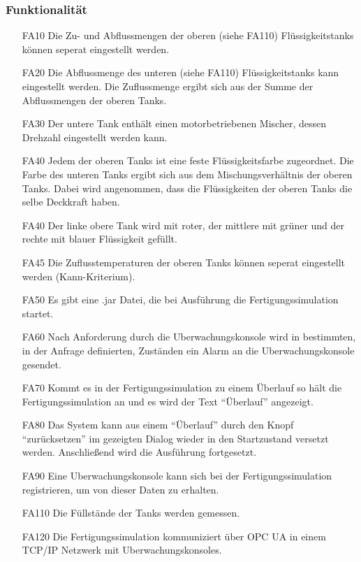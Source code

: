 \documentclass[parskip=full]{scrartcl}
\begin{document}
\subsubsection{Funktionalität}
\begin{enumerate}
\item[FA10] Die Zu- und Abflussmengen der oberen (siehe FA110) Flüssigkeitstanks können seperat eingestellt werden.
\item[FA20] Die Abflussmenge des unteren (siehe FA110) Flüssigkeitstanks kann eingestellt werden. Die Zuflussmenge ergibt sich aus der Summe der Abflussmengen der oberen Tanks.
\item[FA30] Der untere Tank enthält einen motorbetriebenen Mischer, dessen Drehzahl eingestellt werden kann.
\item[FA40] Jedem der oberen Tanks ist eine feste Flüssigkeitsfarbe zugeordnet. Die Farbe des unteren Tanks ergibt sich aus dem Mischungsverhältnis der oberen Tanks. Dabei wird
  angenommen, dass die Flüssigkeiten der oberen Tanks die selbe Deckkraft haben.
\item[FA40] Der linke obere Tank wird mit roter, der mittlere mit grüner und der rechte mit blauer Flüssigkeit gefüllt.
\item[FA45] Die Zuflusstemperaturen der oberen Tanks können seperat eingestellt werden (Kann-Kriterium).
\item[FA50] Es gibt eine .jar Datei, die bei Ausführung die \gls{Fertigungssimulation} startet.
\item[FA60] Nach Anforderung durch die \gls{Uberwachungskonsole} wird in bestimmten, in der Anfrage definierten, Zust\"anden ein Alarm an die \gls{Uberwachungskonsole} gesendet.
\item[FA70] Kommt es in der \gls{Fertigungssimulation} zu einem \"Uberlauf so h\"alt die \gls{Fertigungssimulation} an und es wird der Text "`\"Uberlauf"' angezeigt.
\item[FA80] Das System kann aus einem "`\"Uberlauf"' durch den Knopf "`zur\"ucksetzen"' im gezeigten Dialog wieder in den Startzustand versetzt werden. Anschlie{\ss}end wird die Ausführung fortgesetzt.
\item[FA90] Eine \gls{Uberwachungskonsole} kann sich bei der \gls{Fertigungssimulation} registrieren, um von dieser Daten zu erhalten.
\item[FA110] Die Füllstände der Tanks werden gemessen.
\item[FA120] Die \gls{Fertigungssimulation} kommuniziert über \gls{OPC UA} in einem \gls{TCP/IP} Netzwerk mit \glspl{Uberwachungskonsole}.

\end{enumerate}
\end{document}
